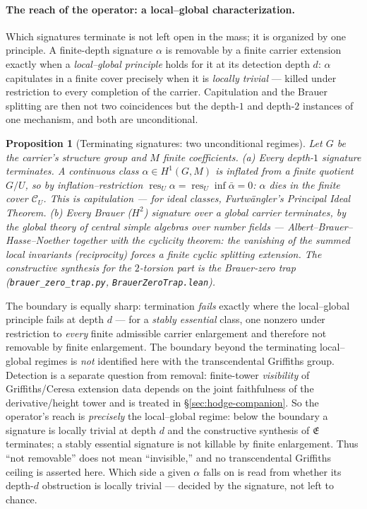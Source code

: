 \documentclass[11pt]{article}
\newtheorem{proposition}[theorem]{Proposition}
\theoremstyle{definition}
\begin{document}
\paragraph{The reach of the operator: a local--global characterization.} Which signatures terminate is not
left open in the mass; it is organized by one principle. A finite-depth signature $\alpha$ is removable by a
finite carrier extension exactly when a \emph{local--global principle} holds for it at its detection depth $d$:
$\alpha$ capitulates in a finite cover precisely when it is \emph{locally trivial} --- killed under restriction to
every completion of the carrier. Capitulation and the Brauer splitting are then not two coincidences but the
depth-$1$ and depth-$2$ instances of one mechanism, and both are unconditional.
\begin{proposition}[Terminating signatures: two unconditional regimes]\label{prop:terminating}
Let $G$ be the carrier's structure group and $M$ finite coefficients.
\textup{(a)} \emph{Every} depth-$1$ signature terminates. A continuous class $\alpha\in H^1(G,M)$ is inflated from
a finite quotient $G/U$, so by inflation--restriction $\operatorname{res}_U\alpha=\operatorname{res}_U
\operatorname{inf}\bar\alpha=0$: $\alpha$ dies in the finite cover $\mathcal C_U$. This is capitulation --- for
ideal classes, Furtw\"angler's Principal Ideal Theorem.
\textup{(b)} \emph{Every} Brauer ($H^2$) signature over a global carrier terminates, by the global theory of
central simple algebras over number fields --- Albert--Brauer--Hasse--Noether together with the cyclicity
theorem: the vanishing of the summed local invariants (reciprocity) forces a finite cyclic splitting extension. The constructive synthesis for the $2$-torsion part is the Brauer-zero trap
(\texttt{brauer\_zero\_trap.py}, \texttt{BrauerZeroTrap.lean}).
\end{proposition}
\noindent The boundary is equally sharp: termination \emph{fails} exactly where the local--global principle fails
at depth $d$ --- for a \emph{stably essential} class, one nonzero under restriction to \emph{every} finite
admissible carrier enlargement and therefore not removable by finite enlargement. The boundary beyond the
terminating local--global regimes is \emph{not} identified here with the transcendental Griffiths group.
Detection is a separate question from removal: finite-tower \emph{visibility} of Griffiths/Ceresa extension data
depends on the joint faithfulness of the derivative/height tower and is treated in \S\ref{sec:hodge-companion}. So the
operator's reach is \emph{precisely} the local--global regime: below the boundary a signature is locally trivial
at depth $d$ and the constructive synthesis of $\mathfrak E$ terminates; a stably essential signature is not
killable by finite enlargement. Thus ``not removable'' does not mean ``invisible,'' and no transcendental
Griffiths ceiling is asserted here. Which side a given $\alpha$ falls on is read from whether its depth-$d$
obstruction is locally trivial --- decided by the signature, not left to chance.
\end{document}
